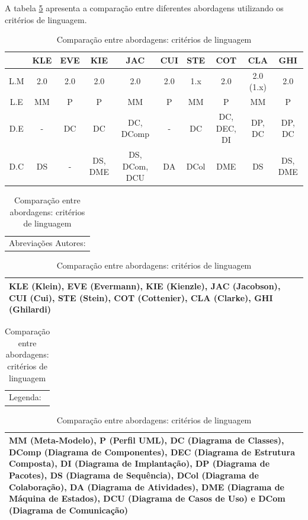 A tabela \ref{tab:comparison_table_language} apresenta a comparação entre diferentes abordagens utilizando os critérios de linguagem.

\begin{table}[h]
	\centering
	\begin{tabular}{ | c | c | c | c | c | c | c | c | c | c | }
		\hline
		 & KLE & EVE & KIE & JAC & CUI & STE & COT & CLA & GHI \\
		\hline
		 L.M & 2.0 & 2.0 & 2.0 & 2.0 & 2.0 & 1.x & 2.0 & 2.0 (1.x) & 2.0 \\
		\hline
		 L.E & MM & P & P & MM & P & MM & P & MM & P \\
		\hline
		 D.E & - & DC & DC & DC, DComp & - & DC & DC, DEC, DI & DP, DC & DP, DC\\
		\hline
		 D.C & DS & - & DS, DME & DS, DCom, DCU & DA & DCol & DME & DS & DS, DME \\
		\hline
	\end{tabular}
	
	\hspace{2em}

	\begin{tabular}{  p{16.6cm}  }
		Abreviações Autores: \\
	\end{tabular}
	
	\begin{tabular}{ | p{16.6cm} | }
		\hline
		KLE (Klein), EVE (Evermann), KIE (Kienzle), JAC (Jacobson), CUI (Cui), STE (Stein), COT (Cottenier), CLA (Clarke), GHI (Ghilardi) \\
		\hline
	\end{tabular}
	
	\begin{tabular}{  p{16.6cm}  }
		Legenda: \\
	\end{tabular}

	\begin{tabular}{ | p{16.6cm} | }
		\hline
		MM (Meta-Modelo), P (Perfil UML), DC (Diagrama de Classes), DComp (Diagrama de Componentes), DEC (Diagrama de Estrutura Composta), DI
		(Diagrama de Implantação), DP (Diagrama de Pacotes), DS (Diagrama de Sequência), DCol (Diagrama de Colaboração), DA (Diagrama de Atividades), 
		DME (Diagrama de Máquina de Estados), DCU (Diagrama de Casos de Uso) e DCom (Diagrama de Comunicação)\\
		\hline
	\end{tabular}
	\caption{Comparação entre abordagens: critérios de linguagem}
	\label{tab:comparison_table_language}
\end{table} 


